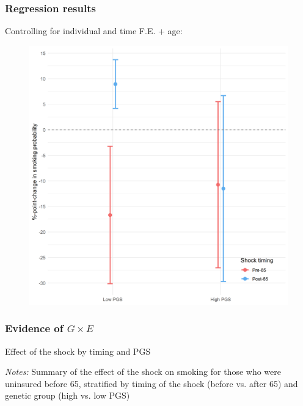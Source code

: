\documentclass[10pt,compress,xcolor=dvipsnames,aspectratio=169]{beamer}    %
\newcounter{ex}
\newcommand{\1}[1]{\mathrm{1\hspace*{-2.5pt}l}[#1]}	%
\begin{document}
\begin{frame}
\frametitle{Regression results}
Controlling for individual and time F.E. + age:

\begin{figure}[hbtp]
\centering
\includegraphics[height=0.8\textheight]{../../3_output/shock_effects/main_6070_100_cv.png}
\label{fig:maincoeffplot}
\end{figure}
\hyperlink{frame:fullreg}{}

\end{frame}

\begin{frame}
\frametitle{Evidence of $G \times E$} \label{frame:regtab}

\begin{table}[ht]
	\caption{Effect of the shock by timing and PGS}
	\small\resizebox{0.9\textheight}{!}{
	
	}

	\vspace{1ex}
	{\raggedright \tiny \textit{Notes:} Summary of the effect of the shock on smoking for those who were uninsured before 65, stratified by timing of the shock (before vs. after 65) and genetic group (high vs. low PGS) \par}

\end{table}

\end{frame}
\end{document}
